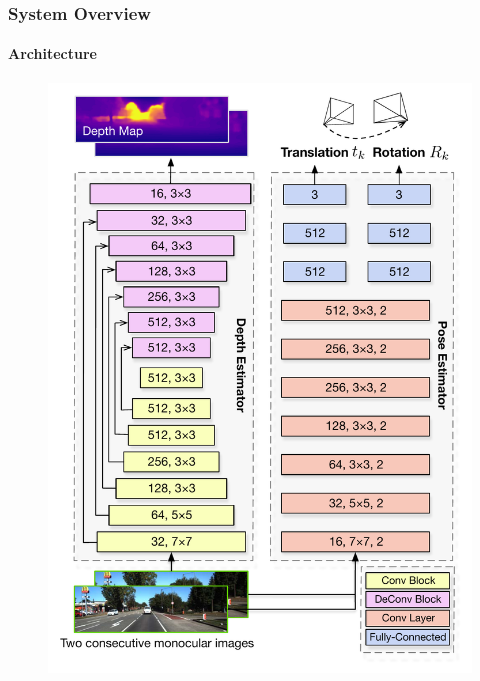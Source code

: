 \begin{frame}
    \frametitle{System Overview}
    \framesubtitle{Architecture}
    \begin{figure}
        \includegraphics[scale=0.3]{images/SystemOverview.pdf}
    \end{figure}
\end{frame}

